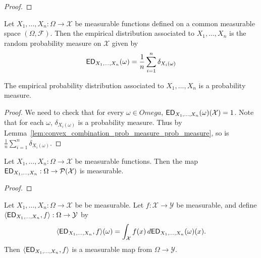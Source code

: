 \begin{proof}
  \uses{}
  \notready
\end{proof}


\begin{definition}
  \label{def:empiricalProbabilityDistribution}
  \notready
  Let $X_1, \dots, X_n : \Omega \to \mathcal{X}$ be measurable functions defined on a common measurable space $(\Omega, \mathcal{F})$. Then the empirical distribution associated to $X_1, \dots, X_n$ is the random probability measure on $\mathcal{X}$ given by
  \[
  {\sf ED}_{X_1, \dots, X_n}(\omega) = \frac{1}{n}\sum_{i=1}^n \delta_{X_i (\omega)}
  \]
\end{definition}

\begin{lemma}
  \label{lem:empiricalProbabilityDistribution_probability_meaure}
  \notready
  The empirical probability distribution associated to $X_1, \dots, X_n$ is a probability measure.
\end{lemma}

\begin{proof}
  \notready
We need to check that for every $\omega \in Omega$, ${\sf ED}_{X_1, \dots, X_n}(\omega)(\mathcal{X}) = 1$. Note that for each $\omega$, $\delta_{X_i (\omega)}$ is a probability measure. Thus by Lemma~\ref{lem:convex_combination_prob_measure_prob_measure}, so is $\frac{1}{n}\sum_{i=1}^n \delta_{X_i (\omega)}$.
\end{proof}

\begin{lemma}
  \label{lem:empiricalProbabilityDistribution_map_measurable}
  \notready
  Let $X_1, \dots, X_n : \Omega \to \mathcal{X}$ be measurable functions. Then the map ${\sf ED}_{X_1, \dots, X_n} : \Omega \to \mathcal{P}(\mathcal{X})$ is measurable.
\end{lemma}

\begin{proof}
  \uses{}
  \notready
\end{proof}


\begin{lemma}
  \label{lem:empiricalProbabilityDistribution_test_function_measurable}
  \notready
  Let $X_1, \dots, X_n : \Omega \to \mathcal{X}$ be be measurable. Let $f : \mathcal{X} \to \mathcal{Y}$ be measurable, and define $\langle {\sf ED}_{X_1, \dots, X_n}, f \rangle: \Omega \to \mathcal{Y}$ by
  \[
  \langle {\sf ED}_{X_1, \dots, X_n}, f \rangle(\omega) = \int_{\mathcal{X}}f(x) \, d{\sf ED}_{X_1, \dots, X_n}(\omega)(x).
  \]
  Then $\langle {\sf ED}_{X_1, \dots, X_n}, f \rangle$ is a measurable map from $\Omega \to \mathcal{Y}$.
\end{lemma}

